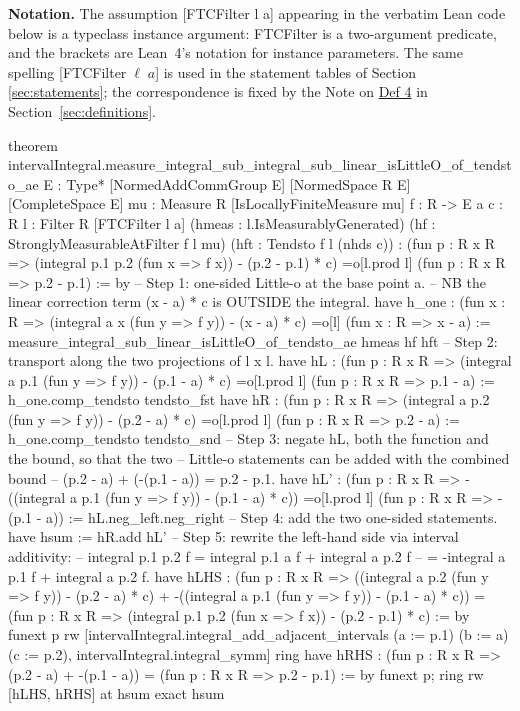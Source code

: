 \documentclass[11pt,reqno]{amsart}
\begin{document}
\noindent\textbf{Notation.} The assumption \textsf{[FTCFilter l a]}
appearing in the verbatim Lean code below is a typeclass instance argument: 
\textsf{FTCFilter} is a two-argument predicate, and the brackets are
Lean~4's notation for instance parameters. The same spelling \textsf{%
[FTCFilter}$\;\ell\;a$\textsf{]} is used in the statement tables of Section~%
\ref{sec:statements}; the correspondence is fixed by the Note on \hyperlink{def:FTCF}%
{Def 4} in Section~\ref{sec:definitions}.

\text{ \ } \text{ \ } 
\begin{verbatimbox}
theorem
  intervalIntegral.measure_integral_sub_integral_sub_linear_isLittleO_of_tendsto_ae
    {E : Type*} [NormedAddCommGroup E] [NormedSpace R E] [CompleteSpace E]
    {mu : Measure R} [IsLocallyFiniteMeasure mu]
    {f : R -> E} {a c : R} {l : Filter R} [FTCFilter l a]
    (hmeas : l.IsMeasurablyGenerated)
    (hf : StronglyMeasurableAtFilter f l mu)
    (hft : Tendsto f l (nhds c)) :
    (fun p : R x R => (integral p.1 p.2 (fun x => f x)) - (p.2 - p.1) * c)
      =o[l.prod l] (fun p : R x R => p.2 - p.1) := by
  -- Step 1: one-sided Little-o at the base point a.
  --   NB the linear correction term (x - a) * c is OUTSIDE the integral.
  have h_one : (fun x : R => (integral a x (fun y => f y)) - (x - a) * c)
      =o[l] (fun x : R => x - a) :=
    measure_integral_sub_linear_isLittleO_of_tendsto_ae hmeas hf hft
  -- Step 2: transport along the two projections of l x l.
  have hL : (fun p : R x R => (integral a p.1 (fun y => f y)) - (p.1 - a) * c)
      =o[l.prod l] (fun p : R x R => p.1 - a) :=
    h_one.comp_tendsto tendsto_fst
  have hR : (fun p : R x R => (integral a p.2 (fun y => f y)) - (p.2 - a) * c)
      =o[l.prod l] (fun p : R x R => p.2 - a) :=
    h_one.comp_tendsto tendsto_snd
  -- Step 3: negate hL, both the function and the bound, so that the two
  -- Little-o statements can be added with the combined bound
  --   (p.2 - a) + (-(p.1 - a)) = p.2 - p.1.
  have hL' : (fun p : R x R =>
        -((integral a p.1 (fun y => f y)) - (p.1 - a) * c))
      =o[l.prod l] (fun p : R x R => -(p.1 - a)) :=
    hL.neg_left.neg_right
  -- Step 4: add the two one-sided statements.
  have hsum := hR.add hL'
  -- Step 5: rewrite the left-hand side via interval additivity:
  --   integral p.1 p.2 f = integral p.1 a f + integral a p.2 f
  --                      = -integral a p.1 f + integral a p.2 f.
  have hLHS :
      (fun p : R x R =>
          ((integral a p.2 (fun y => f y)) - (p.2 - a) * c)
          + -((integral a p.1 (fun y => f y)) - (p.1 - a) * c))
        = (fun p : R x R =>
          (integral p.1 p.2 (fun x => f x)) - (p.2 - p.1) * c) := by
    funext p
    rw [intervalIntegral.integral_add_adjacent_intervals
          (a := p.1) (b := a) (c := p.2),
        intervalIntegral.integral_symm]
    ring
  have hRHS :
      (fun p : R x R => (p.2 - a) + -(p.1 - a))
        = (fun p : R x R => p.2 - p.1) := by
    funext p; ring
  rw [hLHS, hRHS] at hsum
  exact hsum
\end{verbatimbox}
\text{ \ } \text{ \ }
\end{document}
